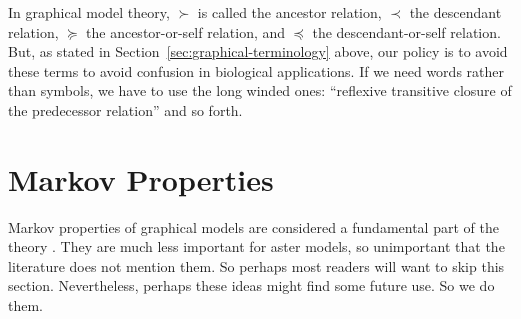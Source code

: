 In graphical model theory,
$\succ$ is called the ancestor relation,
$\prec$ the descendant relation,
$\succeq$ the ancestor-or-self relation, and
$\preceq$ the descendant-or-self relation.
But, as stated in Section~\ref{sec:graphical-terminology} above,
our policy is to avoid these terms
to avoid confusion in biological applications.
If we need words rather than symbols, we have to use the long winded ones:
``reflexive transitive closure of the predecessor relation'' and so forth.

\section{Markov Properties}

Markov properties of graphical models are considered a fundamental part
of the theory \citep[Section~3.2]{lauritzen}.  They are much less important
for aster models, so unimportant that the literature does not mention them.
So perhaps most readers will want to skip this section.  Nevertheless,
perhaps these ideas might find some future use.  So we do them.

